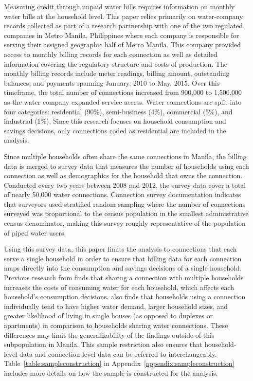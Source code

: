 \documentclass[12pt]{article}
\begin{document}
Measuring credit through unpaid water bills requires information on monthly water bills at the household level.  This paper relies primarily on water-company records collected as part of a research partnership with one of the two regulated companies in Metro Manila, Philippines where each company is responsible for serving their assigned geographic half of Metro Manila.  This company provided access to monthly billing records for each connection as well as detailed information covering the regulatory structure and costs of production.  The monthly billing records include meter readings, billing amount, outstanding balances, and payments spanning January, 2010 to May, 2015.  Over this timeframe, the total number of connections increased from 900,000 to 1,500,000 as the water company expanded service access.  Water connections are split into four categories: residential (90\%), semi-business (4\%), commercial (5\%), and industrial (1\%).  Since this research focuses on household consumption and savings decisions, only connections coded as residential are included in the analysis.  

Since multiple households often share the same connections in Manila, the billing data is merged to survey data that measures the number of households using each connection as well as demographics for the household that owns the connection.  Conducted every two years between 2008 and 2012, the survey data cover a total of nearly 50,000 water connections.  Connection survey documentation indicates that surveyors used stratified random sampling where the number of connections surveyed was proportional to the census population in the smallest administrative census denominator, making this survey roughly representative of the population of piped water users.  

Using this survey data, this paper limits the analysis to connections that each serve a single household in order to ensure that billing data for each connection maps directly into the consumption and savings decisions of a single household.  Previous research from \cite{wjv} finds that sharing a connection with multiple households increases the costs of consuming water for each household, which affects each household's consumption  decisions.  \cite{wjv} also finds that households using a connection individually tend to have higher water demand, larger household sizes, and greater likelihood of living in single houses (as opposed to duplexes or apartments) in comparison to households sharing water connections.  These differences may limit the generalizability of the findings outside of this subpopulation in Manila.  This sample restriction also ensures that household-level data and connection-level data can be referred to interchangeably.  Table~\ref{table:sampleconstruction} in Appendix~\ref{appendix:sampleconstruction} includes more details on how the sample is constructed for the analysis. 
\end{document}

